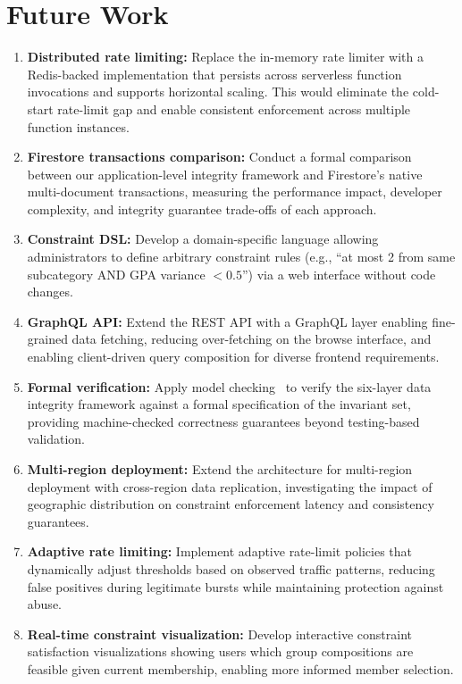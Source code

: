 \documentclass[11pt,a4paper]{article}
\theoremstyle{plain}
\theoremstyle{definition}
\begin{document}
\section{Future Work}
\label{sec:future}

\begin{enumerate}[noitemsep,topsep=4pt]
    \item \textbf{Distributed rate limiting:} Replace the in-memory rate limiter with a Redis-backed implementation that persists across serverless function invocations and supports horizontal scaling. This would eliminate the cold-start rate-limit gap and enable consistent enforcement across multiple function instances.

    \item \textbf{Firestore transactions comparison:} Conduct a formal comparison between our application-level integrity framework and Firestore's native multi-document transactions, measuring the performance impact, developer complexity, and integrity guarantee trade-offs of each approach.

    \item \textbf{Constraint DSL:} Develop a domain-specific language allowing administrators to define arbitrary constraint rules (e.g., ``at most 2 from same subcategory AND GPA variance $< 0.5$'') via a web interface without code changes.

    \item \textbf{GraphQL API:} Extend the REST API with a GraphQL layer enabling fine-grained data fetching, reducing over-fetching on the browse interface, and enabling client-driven query composition for diverse frontend requirements.

    \item \textbf{Formal verification:} Apply model checking~\cite{baier2008} to verify the six-layer data integrity framework against a formal specification of the invariant set, providing machine-checked correctness guarantees beyond testing-based validation.

    \item \textbf{Multi-region deployment:} Extend the architecture for multi-region deployment with cross-region data replication, investigating the impact of geographic distribution on constraint enforcement latency and consistency guarantees.

    \item \textbf{Adaptive rate limiting:} Implement adaptive rate-limit policies that dynamically adjust thresholds based on observed traffic patterns, reducing false positives during legitimate bursts while maintaining protection against abuse.

    \item \textbf{Real-time constraint visualization:} Develop interactive constraint satisfaction visualizations showing users which group compositions are feasible given current membership, enabling more informed member selection.
\end{enumerate}
\end{document}
